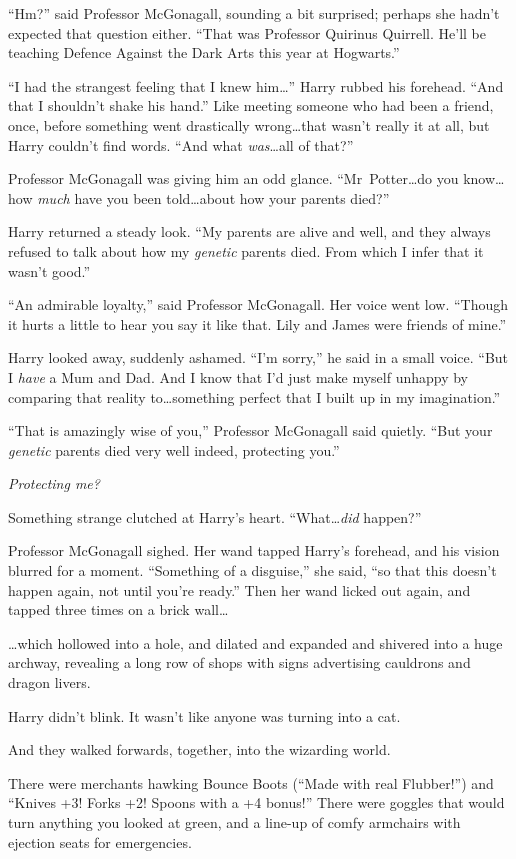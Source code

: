 “Hm?” said Professor McGonagall, sounding a bit surprised; perhaps she hadn’t expected that question either. “That was Professor Quirinus Quirrell. He’ll be teaching Defence Against the Dark Arts this year at Hogwarts.”

“I had the strangest feeling that I knew him…” Harry rubbed his forehead. “And that I shouldn’t shake his hand.” Like meeting someone who had been a friend, once, before something went drastically wrong…that wasn’t really it at all, but Harry couldn’t find words. “And what \emph{was}…all of that?”

Professor McGonagall was giving him an odd glance. “Mr~Potter…do you know…how \emph{much} have you been told…about how your parents died?”

Harry returned a steady look. “My parents are alive and well, and they always refused to talk about how my \emph{genetic} parents died. From which I infer that it wasn’t good.”

“An admirable loyalty,” said Professor McGonagall. Her voice went low. “Though it hurts a little to hear you say it like that. Lily and James were friends of mine.”

Harry looked away, suddenly ashamed. “I’m sorry,” he said in a small voice. “But I \emph{have} a Mum and Dad. And I know that I’d just make myself unhappy by comparing that reality to…something perfect that I built up in my imagination.”

“That is amazingly wise of you,” Professor McGonagall said quietly. “But your \emph{genetic} parents died very well indeed, protecting you.”

\emph{Protecting me?}

Something strange clutched at Harry’s heart. “What…\emph{did} happen?”

Professor McGonagall sighed. Her wand tapped Harry’s forehead, and his vision blurred for a moment. “Something of a disguise,” she said, “so that this doesn’t happen again, not until you’re ready.” Then her wand licked out again, and tapped three times on a brick wall…

…which hollowed into a hole, and dilated and expanded and shivered into a huge archway, revealing a long row of shops with signs advertising cauldrons and dragon livers.

Harry didn’t blink. It wasn’t like anyone was turning into a cat.

And they walked forwards, together, into the wizarding world.

There were merchants hawking Bounce Boots (“Made with real Flubber!”) and “Knives +3! Forks +2! Spoons with a +4 bonus!” There were goggles that would turn anything you looked at green, and a line-up of comfy armchairs with ejection seats for emergencies.

